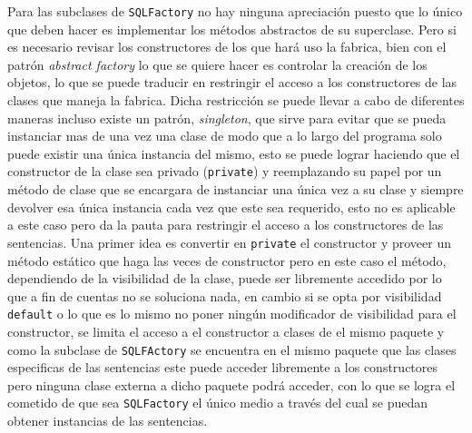Para las subclases de \verb=SQLFactory= no hay ninguna apreciación puesto que lo único que deben hacer es implementar los métodos abstractos de su superclase. Pero si es necesario revisar los constructores de los que hará uso la fabrica, bien con el patrón \textit{abstract factory} lo que se quiere hacer es controlar la creación de los objetos, lo que se puede traducir en restringir el acceso a los constructores de las clases que maneja la fabrica. Dicha restricción se puede llevar a cabo de diferentes maneras incluso existe un patrón, \textit{singleton}, que sirve para evitar que se pueda instanciar mas de una vez una clase de modo que a lo largo del programa solo puede existir una única instancia del mismo\cite{Metsker:2002:DPJ}, esto se puede lograr haciendo que el constructor de la clase sea privado (\verb=private=) y reemplazando su papel por un método de clase que se encargara de instanciar una única vez a su clase y siempre devolver esa única instancia cada vez que este sea requerido, esto no es aplicable a este caso pero da la pauta para restringir el acceso a los constructores de las sentencias. Una primer idea es convertir en \verb=private= el constructor y proveer un método estático que haga las veces de constructor  pero en este caso el método, dependiendo de la visibilidad de la clase, puede ser libremente accedido por lo que a fin de cuentas no se soluciona nada, en cambio si se opta por visibilidad \verb=default= o lo que es lo mismo no poner ningún modificador de visibilidad para el constructor, se limita el acceso a el constructor a clases de el mismo paquete y como la subclase de \verb=SQLFActory= se encuentra en el mismo paquete que las clases especificas de las sentencias este puede acceder libremente a los constructores pero ninguna clase externa a dicho paquete podrá acceder, con lo que se logra el cometido de que sea \verb=SQLFactory= el único medio a través del cual se puedan obtener instancias de las sentencias.   
%
%
